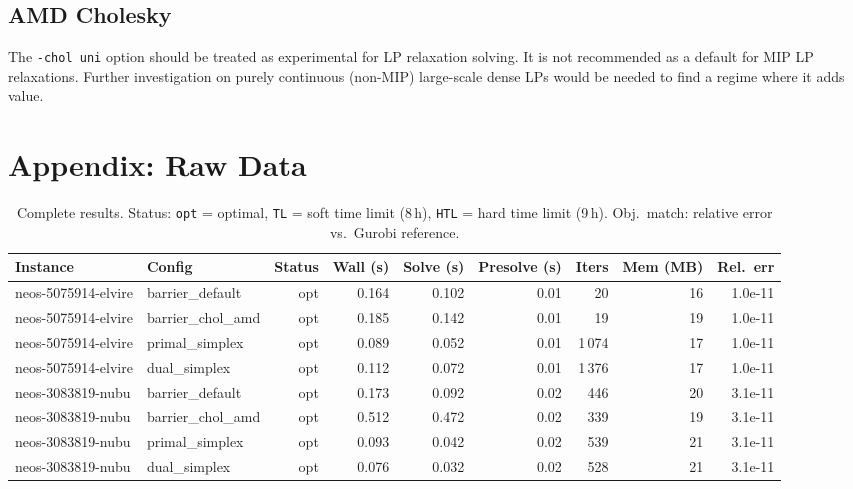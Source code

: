 \documentclass[11pt,a4paper]{article}
\begin{document}
\subsection{AMD Cholesky}

The \texttt{-chol uni} option should be treated as experimental for LP
relaxation solving.  It is not recommended as a default for MIP LP relaxations.
Further investigation on purely continuous (non-MIP) large-scale dense LPs
would be needed to find a regime where it adds value.

\section*{Appendix: Raw Data}

\begin{table}[h]
\centering
\caption{Complete results. Status: \texttt{opt} = optimal, \texttt{TL} = soft
         time limit (8\,h), \texttt{HTL} = hard time limit (9\,h).
         Obj.\ match: relative error vs.\ Gurobi reference.}
\label{tab:raw}
\small
\setlength{\tabcolsep}{4pt}
\begin{tabular}{@{}llrrrrrrr@{}}
\toprule
\textbf{Instance} & \textbf{Config} & \textbf{Status} &
\textbf{Wall (s)} & \textbf{Solve (s)} & \textbf{Presolve (s)} &
\textbf{Iters} & \textbf{Mem (MB)} & \textbf{Rel.\ err} \\
\midrule
neos-5075914-elvire & barrier\_default  & opt & 0.164 & 0.102 & 0.01 & 20      & 16  & 1.0e-11 \\
neos-5075914-elvire & barrier\_chol\_amd & opt & 0.185 & 0.142 & 0.01 & 19      & 19  & 1.0e-11 \\
neos-5075914-elvire & primal\_simplex   & opt & 0.089 & 0.052 & 0.01 & 1\,074  & 17  & 1.0e-11 \\
neos-5075914-elvire & dual\_simplex     & opt & 0.112 & 0.072 & 0.01 & 1\,376  & 17  & 1.0e-11 \\
\midrule
neos-3083819-nubu   & barrier\_default  & opt & 0.173 & 0.092 & 0.02 & 446     & 20  & 3.1e-11 \\
neos-3083819-nubu   & barrier\_chol\_amd & opt & 0.512 & 0.472 & 0.02 & 339     & 19  & 3.1e-11 \\
neos-3083819-nubu   & primal\_simplex   & opt & 0.093 & 0.042 & 0.02 & 539     & 21  & 3.1e-11 \\
neos-3083819-nubu   & dual\_simplex     & opt & 0.076 & 0.032 & 0.02 & 528     & 21  & 3.1e-11 \\

\end{tabular}
\end{table}
\end{document}
